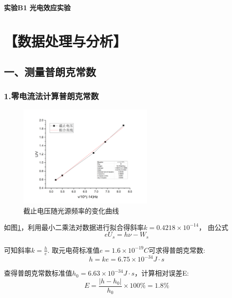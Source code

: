\documentclass[12pt,a4paper,UTF8]{ctexart}
\begin{document}

\begin{center}
\LARGE\textbf{实验B1 光电效应实验}
\end{center}




\section*{【数据处理与分析】}
\subsection*{一、测量普朗克常数}
\subsubsection*{1.零电流法计算普朗克常数}
\begin{figure}[htbp]
	\centering
	\includegraphics[width=0.6\textwidth]{img//reg.png}
	\caption{截止电压随光源频率的变化曲线}
	\label{fig:1}
\end{figure}

如图\ref{fig:1}，利用最小二乘法对数据进行拟合得斜率$k=0.4218\times 10^{-14}$，
由公式
\begin{equation*}
	eU_s=h\nu-W_s
\end{equation*}

可知斜率$k=\frac{h}{e}$.
取元电荷标准值$e=1.6\times 10^{-19}C$可求得普朗克常数:
\begin{equation*}
	h=ke=6.75\times10^{-34} J \cdot s
\end{equation*}

查得普朗克常数标准值$h_0=6.63\times10^{-34} J \cdot s$，计算相对误差E:
\begin{equation*}
	E=\frac{\left\lvert h-h_0\right\rvert }{h_0}\times 100\%=1.8\%
\end{equation*}
\end{document}
